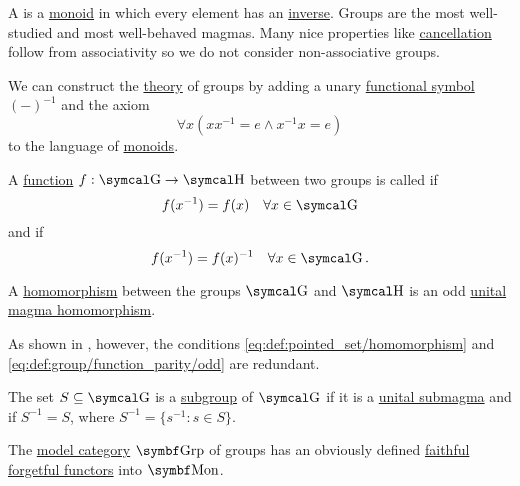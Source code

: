 \begin{definition}\label{def:group}
  A  is a \hyperref[def:unital_magma/associative]{monoid} in which every element has an \hyperref[def:unital_magma_inverse_element]{inverse}. Groups are the most well-studied and most well-behaved magmas. Many nice properties like \hyperref[thm:group_properties/cancellative]{cancellation} follow from associativity so we do not consider non-associative groups.

  \begin{DefEnum}
     We can construct the \hyperref[def:first_order_theory]{theory} of groups by adding a unary \hyperref[def:first_order_logic_language/func]{functional symbol} \( (-)^{-1} \) and the axiom
    \begin{equation}\label{eq:def:group/theory/inverse_axiom}
      \forall x (xx^{-1} = e \wedge x^{-1}x = e)
    \end{equation}
    to the language of \hyperref[def:unital_magma/associative]{monoids}.

     A \hyperref[def:function/single_valued]{function} \( f: \CG \to \CH \) between two groups is called  if
    \begin{equation}\label{eq:def:group/function_parity/even}
      f(x^{-1}) = f(x) \quad\forall x \in \CG
    \end{equation}
    and  if
    \begin{equation}\label{eq:def:group/function_parity/odd}
      f(x^{-1}) = f(x)^{-1} \quad\forall x \in \CG.
    \end{equation}

     A \hyperref[def:first_order_homomorphism]{homomorphism} between the groups \( \CG \) and \( \CH \) is an odd \hyperref[def:unital_magma/homomorphism]{unital magma homomorphism}.

    As shown in , however, the conditions \eqref{eq:def:pointed_set/homomorphism} and \eqref{eq:def:group/function_parity/odd} are redundant.

     The set \( S \subseteq \CG \) is a \hyperref[def:first_order_substructure]{subgroup} of \( \CG \) if it is a \hyperref[def:unital_magma/substructure]{unital submagma} and if \( S^{-1} = S \), where \( S^{-1} = \{ s^{-1} \colon s \in S \} \).

     The \hyperref[def:first_order_model_category]{model category} \( \Cat{Grp} \) of groups has an obviously defined \hyperref[def:faithful_full_functor]{faithful} \hyperref[def:forgetful_functor]{forgetful functors} into \hyperref[def:unital_magma/associative]{\( \Cat{Mon} \)}.


\end{DefEnum}
\end{definition}
